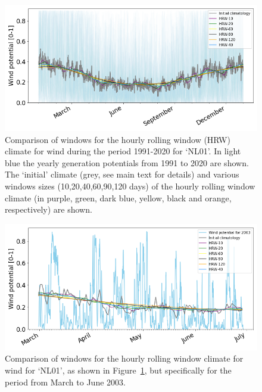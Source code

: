 \documentclass[a4paper,11pt]{extarticle}
\begin{document}
\begin{figure}[hb]
    \centering
    \includegraphics[width=\textwidth]{Climatology_sensitivity_wind}
    \caption{Comparison of windows for the hourly rolling window (HRW) climate for wind during the period 1991-2020 for `NL01'. In light blue the yearly generation potentials from 1991 to 2020 are shown. The `initial' climate (grey, see main text for details) and various windows sizes (10,20,40,60,90,120 days) of the hourly rolling window climate (in purple, green, dark blue, yellow, black and orange, respectively) are shown.}
    \label{SIfig:clima_sense_wind}
\end{figure}

\begin{figure}[ht]
    \centering
    \includegraphics[width=\textwidth]{Climatology_sensitivity_zoom_wind}
    \caption{Comparison of windows for the hourly rolling window climate for wind for `NL01', as shown in Figure~\ref{SIfig:clima_sense_wind}, but specifically for the period from March to June 2003.}
    \label{SIfig:clima_sense_zoom_wind}
\end{figure}



\end{document}
